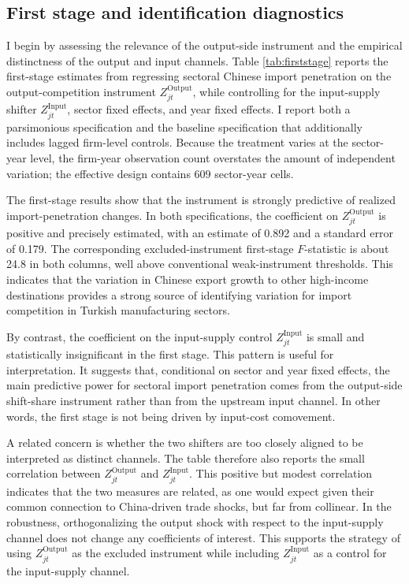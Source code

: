 \documentclass[12pt]{article}
\begin{document}
\subsection{First stage and identification diagnostics}

I begin by assessing the relevance of the output-side instrument and the empirical distinctness of the output and input channels. Table \ref{tab:firststage} reports the first-stage estimates from regressing sectoral Chinese import penetration on the output-competition instrument \(Z^{\text{Output}}_{jt}\), while controlling for the input-supply shifter \(Z^{\text{Input}}_{jt}\), sector fixed effects, and year fixed effects. I report both a parsimonious specification and the baseline specification that additionally includes lagged firm-level controls. Because the treatment varies at the sector-year level, the firm-year observation count overstates the amount of independent variation; the effective design contains 609 sector-year cells.

The first-stage results show that the instrument is strongly predictive of realized import-penetration changes. In both specifications, the coefficient on \(Z^{\text{Output}}_{jt}\) is positive and precisely estimated, with an estimate of 0.892 and a standard error of 0.179. The corresponding excluded-instrument first-stage \(F\)-statistic is about 24.8 in both columns, well above conventional weak-instrument thresholds. This indicates that the variation in Chinese export growth to other high-income destinations provides a strong source of identifying variation for import competition in Turkish manufacturing sectors.

By contrast, the coefficient on the input-supply control \(Z^{\text{Input}}_{jt}\) is small and statistically insignificant in the first stage. This pattern is useful for interpretation. It suggests that, conditional on sector and year fixed effects, the main predictive power for sectoral import penetration comes from the output-side shift-share instrument rather than from the upstream input channel. In other words, the first stage is not being driven by input-cost comovement.

A related concern is whether the two shifters are too closely aligned to be interpreted as distinct channels. The table therefore also reports the small correlation between \(Z^{\text{Output}}_{jt}\) and \(Z^{\text{Input}}_{jt}\). This positive but modest correlation indicates that the two measures are related, as one would expect given their common connection to China-driven trade shocks, but far from collinear. In the robustness, orthogonalizing the output shock with respect to the input-supply channel does not change any coefficients of interest. This supports the strategy of using \(Z^{\text{Output}}_{jt}\) as the excluded instrument while including \(Z^{\text{Input}}_{jt}\) as a control for the input-supply channel.
\end{document}
